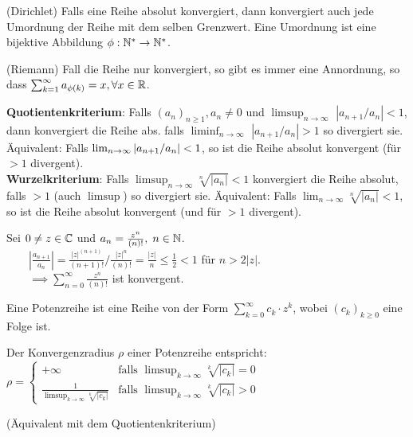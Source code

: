\color{blue}
\Satz (Dirichlet) Falls eine Reihe absolut konvergiert, dann konvergiert auch jede Umordnung
der Reihe mit dem selben Grenzwert. Eine Umordnung ist eine bijektive Abbildung $\phi : \mathbb{N}^{*} \to \mathbb{N}^{*}$.

\Satz (Riemann) Fall die Reihe nur konvergiert, so gibt es immer eine Annordnung, so 
dass $\sum_{k = 1}^{\infty} a_{\phi(k)} = x, \forall x \in \mathbb{R}$.
\color{black}

\begin{tcolorbox}
	\textbf{Quotientenkriterium}: Falls $(a_n)_{n \geq 1}, a_n \neq 0$ und $\limsup_{n \to \infty}$ $\left|a_{n+1} / {a_n}\right|<1$, 
	dann konvergiert die Reihe abs. falls $\liminf_{n \to \infty}$ $\left|a_{n+1} / {a_n}\right|>1$ so divergiert sie.
	Äquivalent: Falls $\lim_{n \rightarrow \infty}\left|a_{n+1} / {a_n}\right|<1$, so ist die Reihe absolut konvergent (für \(>1\) divergent). \\

	\textbf{Wurzelkriterium}: Falls $\limsup_{n \to \infty} \sqrt[n]{|a_n|}<1$ konvergiert die Reihe absolut,
	falls $>1$ (auch $\limsup$) so divergiert sie.
	Äquivalent: Falls $\lim_{n\rightarrow\infty}\sqrt[n]{|a_n|}<1$, so ist die Reihe absolut konvergent (und für $>1$ divergent).
\end{tcolorbox}


\Bsp Sei \(0\neq z\in\mathbb{C}\) und \(a_n=\frac{z^{n}}{(n)!},\;n\in\mathbb{N}\).\\
\(\qquad \left|\frac{a_{n+1}}{a_n}\right|=\frac{|z|^{(n+1)}}{(n+1)!} {\Bigg/} \frac{|z|^{n}}{(n)!} = \frac{|z|}n \leq \frac 12<1 \) für \(n>2|z|\).\\
\(\qquad\implies\sum_{n=0}^\infty \frac{z^{n}}{(n)!}\) ist konvergent.



Eine Potenzreihe ist eine Reihe von der Form $\sum_{k = 0}^{\infty} c_k \cdot z^k$, wobei $(c_k)_{k \geq 0}$
eine Folge ist. 

\begin{tcolorbox}
	\Def Der Konvergenzradius $\rho$ einer Potenzreihe entspricht:\\
	$\rho = 
	\begin{cases}
		+\infty & \text{falls } \limsup_{k\rightarrow\infty}\sqrt[k]{|c_k|}=0 \\
		\frac{1}{\limsup_{k\rightarrow\infty}\sqrt[k]{|c_k|}} & \text{falls }\limsup_{k\rightarrow\infty}\sqrt[k]{|c_k|}>0
	\end{cases}$

	(Äquivalent mit dem Quotientenkriterium)
\end{tcolorbox}

